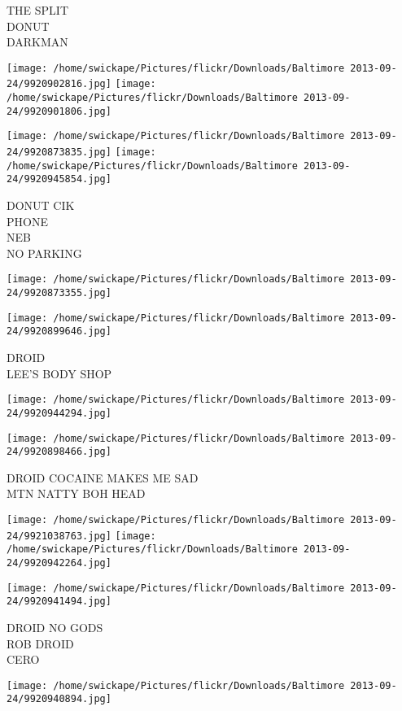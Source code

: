 \documentclass[10pt,letterpaper]{article}
\begin{document}
THE SPLIT\\
DONUT\\
DARKMAN
\pagebreak

\texttt{[image: /home/swickape/Pictures/flickr/Downloads/Baltimore 2013-09-24/9920902816.jpg]}
\texttt{[image: /home/swickape/Pictures/flickr/Downloads/Baltimore 2013-09-24/9920901806.jpg]}

\texttt{[image: /home/swickape/Pictures/flickr/Downloads/Baltimore 2013-09-24/9920873835.jpg]}
\texttt{[image: /home/swickape/Pictures/flickr/Downloads/Baltimore 2013-09-24/9920945854.jpg]}

DONUT CIK\\
PHONE\\
NEB\\
NO PARKING
\pagebreak

\texttt{[image: /home/swickape/Pictures/flickr/Downloads/Baltimore 2013-09-24/9920873355.jpg]}

\vspace{0.25in}
\texttt{[image: /home/swickape/Pictures/flickr/Downloads/Baltimore 2013-09-24/9920899646.jpg]}

DROID\\
LEE'S BODY SHOP
\pagebreak

\texttt{[image: /home/swickape/Pictures/flickr/Downloads/Baltimore 2013-09-24/9920944294.jpg]}

\vspace{0.25in}
\texttt{[image: /home/swickape/Pictures/flickr/Downloads/Baltimore 2013-09-24/9920898466.jpg]}

DROID COCAINE MAKES ME SAD\\
MTN NATTY BOH HEAD
\pagebreak

\texttt{[image: /home/swickape/Pictures/flickr/Downloads/Baltimore 2013-09-24/9921038763.jpg]}
\texttt{[image: /home/swickape/Pictures/flickr/Downloads/Baltimore 2013-09-24/9920942264.jpg]}

\vspace{0.25in}
\texttt{[image: /home/swickape/Pictures/flickr/Downloads/Baltimore 2013-09-24/9920941494.jpg]}

DROID NO GODS\\
ROB DROID\\
CERO
\pagebreak

\texttt{[image: /home/swickape/Pictures/flickr/Downloads/Baltimore 2013-09-24/9920940894.jpg]}
\end{document}
